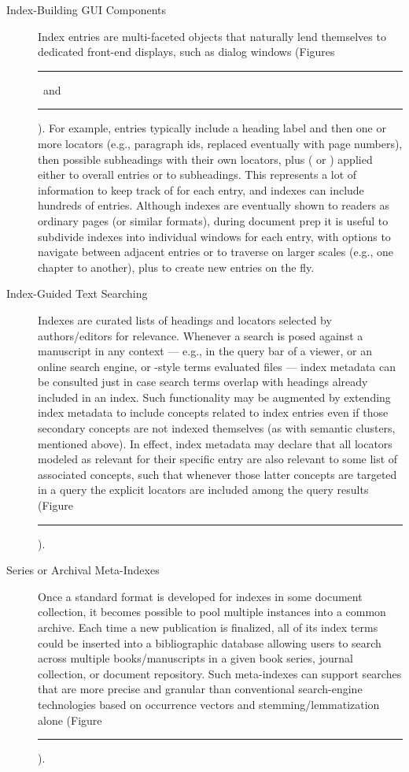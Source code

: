 \documentclass[11pt]{article}
\newcommand\reduline{\bgroup\markoverwith
{\textcolor{ru}{\rule[-.25ex]{3pt}{3.4pt}}}\ULon}
\DeclareRobustCommand{\xfigunderline}[1]{\reduline{#1}
\llap{\dashuline{\phantom{#1}}}%
}
\renewcommand{\Atref}[1]{\textcolor{rgrAt!30}{\xfigunderline{\hspace{-2pt}\autoref{#1}\hspace*{-2pt}}}}
\begin{document}
{{\begin{description}
\item[Index-Building GUI Components]  Index entries are multi-faceted 
objects that naturally lend themselves to dedicated front-end displays, 
such as dialog windows (Figures~\Atref{fig:ss3}~and~\Atref{fig:ss4}).  
For example, entries typically include a heading 
label and then one or more locators (e.g., paragraph ids, replaced 
eventually with page numbers), 
then possible subheadings with their own 
locators, plus  ( or ) applied 
either to overall entries or to subheadings.  This represents a lot 
of information to keep track of for each entry, and indexes can include 
hundreds of entries.  Although indexes are eventually shown 
to readers as ordinary \PDF{} pages (or similar formats), 
during document prep it is useful to subdivide indexes into 
individual \GUI{} windows for each entry, with options to 
navigate between adjacent entries or to traverse on larger 
scales (e.g., one chapter to another), plus to create new 
entries on the fly.

\vspace{-3pt}

\item[Index-Guided Text Searching]  Indexes are curated lists 
of headings and locators selected by authors/editors for 
relevance.  Whenever a search is posed against a manuscript in 
any context --- e.g., in the query bar of a \PDF{} viewer, or 
an online search engine, or \XQuery{}-style terms evaluated 
\visavis{} \JATS{} files --- index metadata can be consulted 
just in case search terms overlap with headings already included 
in an index.  Such functionality may be augmented by extending 
index metadata to include concepts related to index entries 
even if those secondary concepts are not indexed themselves 
(as with semantic clusters, mentioned above).
In effect, index metadata may declare that all locators 
modeled as relevant for their specific entry are also relevant 
to some list of associated concepts, such that whenever those 
latter concepts are targeted in a query the explicit 
locators are included among the query results (Figure~\Atref{fig:m2m}).   

\vspace{-3pt}

\item[Series or Archival Meta-Indexes]  Once a standard format 
is developed for indexes in some document collection, it becomes 
possible to pool multiple instances into a common archive.  
Each time a new publication is finalized, all of its index 
terms could be inserted into a bibliographic database 
allowing users to search across multiple books/manuscripts 
in a given book series, journal %
collection, or document repository.  Such meta-indexes can support searches 
that are more precise and granular than conventional
search-engine technologies based on occurrence vectors 
and stemming/lemmatization alone (Figure~\Atref{fig:ss5}).\clearpage


\end{description}}}
\end{document}
